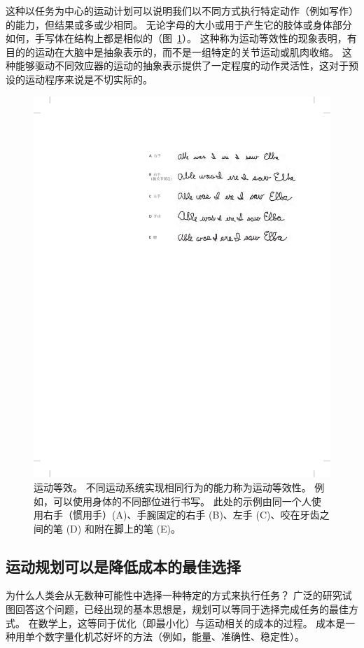 这种以任务为中心的运动计划可以说明我们以不同方式执行特定动作（例如写作）的能力，但结果或多或少相同。
无论字母的大小或用于产生它的肢体或身体部分如何，手写体在结构上都是相似的（图~\ref{fig:30_9}）。
这种称为运动等效性的现象表明，有目的的运动在大脑中是抽象表示的，而不是一组特定的关节运动或肌肉收缩。
这种能够驱动不同效应器的运动的抽象表示提供了一定程度的动作灵活性，这对于预设的运动程序来说是不切实际的。


\begin{figure}[htbp]
	\centering
	\includegraphics[width=0.7\linewidth]{chap30/fig_30_9}
	\caption{运动等效。
		不同运动系统实现相同行为的能力称为运动等效性。
		例如，可以使用身体的不同部位进行书写。
		此处的示例由同一个人使用右手（惯用手）(A)、手腕固定的右手 (B)、左手 (C)、咬在牙齿之间的笔 (D) 和附在脚上的笔 (E)。}
	\label{fig:30_9}
\end{figure}



\subsection{运动规划可以是降低成本的最佳选择}

为什么人类会从无数种可能性中选择一种特定的方式来执行任务？
广泛的研究试图回答这个问题，已经出现的基本思想是，规划可以等同于选择完成任务的最佳方式。
在数学上，这等同于优化（即最小化）与运动相关的成本的过程。
成本是一种用单个数字量化机芯好坏的方法（例如，能量、准确性、稳定性）。


